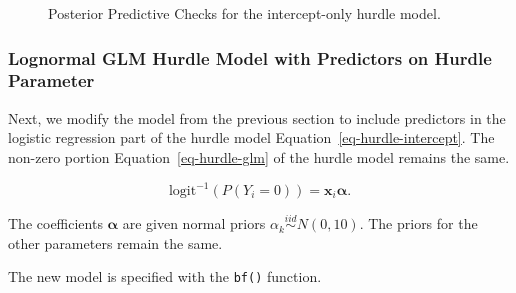 \documentclass[
  letterpaper,
  DIV=11,
  numbers=noendperiod]{scrartcl}
\begin{document}
\begin{figure}

\begin{minipage}[t]{0.50\linewidth}

{\centering 


}

\end{minipage}%
%
\begin{minipage}[t]{0.50\linewidth}

{\centering 


}

\end{minipage}%

\caption{\label{fig-ppc-brm1}Posterior Predictive Checks for the
intercept-only hurdle model.}

\end{figure}

\hypertarget{lognormal-glm-hurdle-model-with-predictors-on-hurdle-parameter}{%
\subsubsection{Lognormal GLM Hurdle Model with Predictors on Hurdle
Parameter}\label{lognormal-glm-hurdle-model-with-predictors-on-hurdle-parameter}}

Next, we modify the model from the previous section to include
predictors in the logistic regression part of the hurdle model
Equation~\ref{eq-hurdle-intercept}. The non-zero portion
Equation~\ref{eq-hurdle-glm} of the hurdle model remains the same.

\[
\mathrm{logit}^{-1}(P(Y_i=0)) = \mathbf{x}_i \boldsymbol{\alpha}.
\]

The coefficients \(\boldsymbol{\alpha}\) are given normal priors
\(\alpha_k \overset{iid}{\sim} N(0, 10).\) The priors for the other
parameters remain the same.

The new model is specified with the \texttt{bf()} function.
\end{document}

